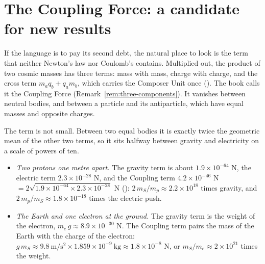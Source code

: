 \section{The Coupling Force: a candidate for new results}\label{sec:al-coupling}

If the language is to pay its second debt, the natural place to look is the term that neither Newton's law nor Coulomb's contains. Multiplied out, the product of two cosmic masses has three terms: mass with mass, charge with charge, and the cross term $m_a q_b + q_a m_b$, which carries the Composer Unit once (). The book calls it the Coupling Force (Remark~\ref{rem:three-components}). It vanishes between neutral bodies, and between a particle and its antiparticle, which have equal masses and opposite charges.

The term is not small. Between two equal bodies it is exactly twice the geometric mean of the other two terms, so it sits halfway between gravity and electricity on a scale of powers of ten.

\par{}\baselineskip{}\baselineskip{}\baselineskip{}\baselineskip\vskip 0pt
\begin{workedexample}
\begin{itemize}
  \item \emph{Two protons one metre apart.} The gravity term is about $1.9 \times 10^{-64}$ N, the electric term $2.3 \times 10^{-28}$ N, and the Coupling term $4.2 \times 10^{-46}$ N $= 2\sqrt{1.9 \times 10^{-64} \times 2.3 \times 10^{-28}}$ N (): $2\,m_S/m_p \approx 2.2 \times 10^{18}$ times gravity, and $2\,m_p/m_S \approx 1.8 \times 10^{-18}$ times the electric push.
  \item \emph{The Earth and one electron at the ground.} The gravity term is the weight of the electron, $m_e\,g \approx 8.9 \times 10^{-30}$ N. The Coupling term pairs the mass of the Earth with the charge of the electron: $g\,m_S \approx 9.8\ \mathrm{m/s^2} \times 1.859 \times 10^{-9}\ \mathrm{kg} \approx 1.8 \times 10^{-8}$ N, or $m_S/m_e \approx 2 \times 10^{21}$ times the weight.
\end{itemize}
\end{workedexample}

